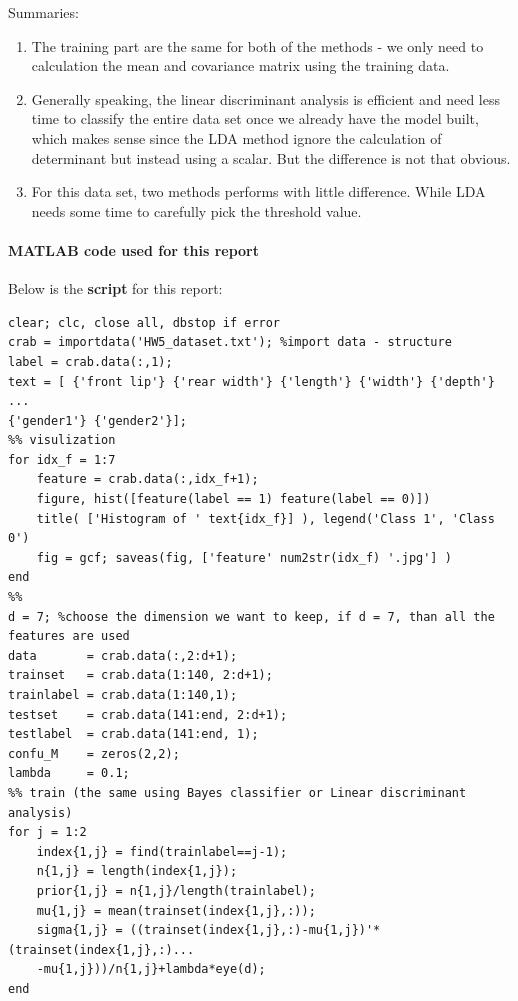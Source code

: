 \documentclass[a4paper]{article}
\begin{document}
\begin{spacing}{2.0}
\large{Summaries:} 
\normalsize
\begin{enumerate}
\item The training part are the same for both of the methods - we only need to calculation the mean and covariance matrix using the training data.

\item Generally speaking, the linear discriminant analysis is efficient and need less time to classify the entire data set once we already have the model built, which makes sense since the LDA method ignore the calculation of determinant but instead using a scalar. But the difference is not that obvious.

\item For this data set, two methods performs with little difference. While LDA needs some time to carefully pick the threshold value.
\end{enumerate}

\newpage
\paragraph{\huge\textbf{ MATLAB code used for this report\\} }
Below is the \textbf{script} for this report:
\begin{lstlisting}
clear; clc, close all, dbstop if error
crab = importdata('HW5_dataset.txt'); %import data - structure
label = crab.data(:,1);
text = [ {'front lip'} {'rear width'} {'length'} {'width'} {'depth'} ...
{'gender1'} {'gender2'}];
%% visulization
for idx_f = 1:7
    feature = crab.data(:,idx_f+1);
    figure, hist([feature(label == 1) feature(label == 0)])
    title( ['Histogram of ' text{idx_f}] ), legend('Class 1', 'Class 0')
    fig = gcf; saveas(fig, ['feature' num2str(idx_f) '.jpg'] )
end
%%
d = 7; %choose the dimension we want to keep, if d = 7, than all the features are used
data       = crab.data(:,2:d+1);
trainset   = crab.data(1:140, 2:d+1);
trainlabel = crab.data(1:140,1);
testset    = crab.data(141:end, 2:d+1);
testlabel  = crab.data(141:end, 1);
confu_M    = zeros(2,2);
lambda     = 0.1;
%% train (the same using Bayes classifier or Linear discriminant analysis)
for j = 1:2
    index{1,j} = find(trainlabel==j-1);
    n{1,j} = length(index{1,j});
    prior{1,j} = n{1,j}/length(trainlabel);
    mu{1,j} = mean(trainset(index{1,j},:));
    sigma{1,j} = ((trainset(index{1,j},:)-mu{1,j})'*(trainset(index{1,j},:)...
    -mu{1,j}))/n{1,j}+lambda*eye(d);
end


\end{lstlisting}
\end{spacing}
\end{document}
